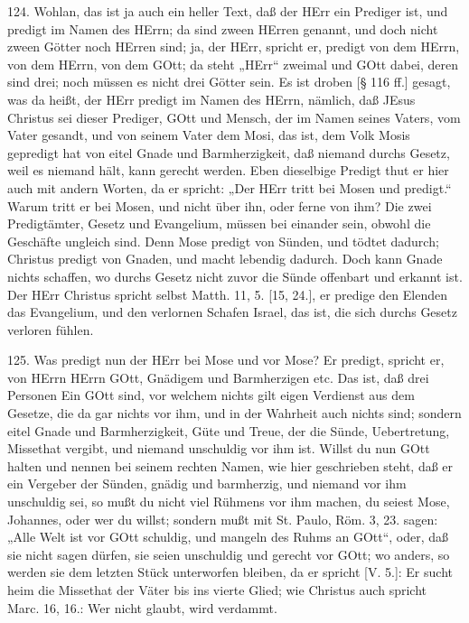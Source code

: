 124. Wohlan, das ist ja auch ein heller Text, daß der HErr ein Prediger ist, und predigt im Namen des HErrn; da sind zween HErren genannt, und doch nicht zween Götter noch HErren sind; ja, der HErr, spricht er, predigt von dem HErrn, von dem HErrn, von dem GOtt; da steht „HErr“ zweimal und GOtt dabei, deren sind drei; noch müssen es nicht drei Götter sein. Es ist droben [§ 116 ff.] gesagt, was da heißt, der HErr predigt im Namen des HErrn, nämlich, daß JEsus Christus sei dieser Prediger, GOtt und Mensch, der im Namen seines Vaters, vom Vater gesandt, und von seinem Vater dem Mosi, das ist, dem Volk Mosis gepredigt hat von eitel Gnade und Barmherzigkeit, daß niemand durchs Gesetz, weil es niemand hält, kann gerecht werden. Eben dieselbige Predigt thut er hier auch mit andern Worten, da er spricht: „Der HErr tritt bei Mosen und predigt.“ Warum tritt er bei Mosen, und nicht über ihn, oder ferne von ihm? Die zwei Predigtämter, Gesetz und Evangelium, müssen bei einander sein, obwohl die Geschäfte ungleich sind. Denn Mose predigt von Sünden, und tödtet dadurch; Christus predigt von Gnaden, und macht lebendig dadurch. Doch kann Gnade nichts schaffen, wo durchs Gesetz nicht zuvor die Sünde offenbart und erkannt ist. Der HErr Christus spricht selbst Matth. 11, 5. [15, 24.], er predige den Elenden das Evangelium, und den verlornen Schafen Israel, das ist, die sich durchs Gesetz verloren fühlen.

125. Was predigt nun der HErr bei Mose und vor Mose? Er predigt, spricht er, von HErrn HErrn GOtt, Gnädigem und Barmherzigen etc. Das ist, daß drei Personen Ein GOtt sind, vor welchem nichts gilt eigen Verdienst aus dem Gesetze, die da gar nichts vor ihm, und in der Wahrheit auch nichts sind; sondern eitel Gnade und Barmherzigkeit, Güte und Treue, der die Sünde, Uebertretung, Missethat vergibt, und niemand unschuldig vor ihm ist. Willst du nun GOtt halten und nennen bei seinem rechten Namen, wie hier geschrieben steht, daß er ein Vergeber der Sünden, gnädig und barmherzig, und niemand vor ihm unschuldig sei, so mußt du nicht viel Rühmens vor ihm machen, du seiest Mose, Johannes, oder wer du willst; sondern mußt mit St. Paulo, Röm. 3, 23. sagen: „Alle Welt ist vor GOtt schuldig, und mangeln des Ruhms an GOtt“, oder, daß sie nicht sagen dürfen, sie seien unschuldig und gerecht vor GOtt; wo anders, so werden sie dem letzten Stück unterworfen bleiben, da er spricht [V. 5.]: Er sucht heim die Missethat der Väter bis ins vierte Glied; wie Christus auch spricht Marc. 16, 16.: Wer nicht glaubt, wird verdammt.

